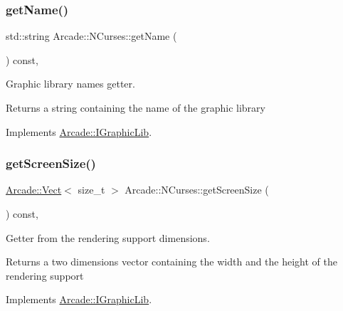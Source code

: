 \subsubsection{\texorpdfstring{get\+Name()}{getName()}}
{\footnotesize\ttfamily std\+::string Arcade\+::\+N\+Curses\+::get\+Name (\begin{DoxyParamCaption}{ }\end{DoxyParamCaption}) const\hspace{0.3cm}{\ttfamily [final]}, {\ttfamily [virtual]}}



Graphic library name\textquotesingle{}s getter. 

\begin{DoxyReturn}{Returns}
a string containing the name of the graphic library 
\end{DoxyReturn}


Implements \hyperlink{class_arcade_1_1_i_graphic_lib_aecc266c4ac10f07f4cdca023e74e843d}{Arcade\+::\+I\+Graphic\+Lib}.

\mbox{\label{class_arcade_1_1_n_curses_ae7a4eb70b4a07dc2d65f135c6f7ceb50}} 
\subsubsection{\texorpdfstring{get\+Screen\+Size()}{getScreenSize()}}
{\footnotesize\ttfamily \hyperlink{class_arcade_1_1_vect}{Arcade\+::\+Vect}$<$ size\+\_\+t $>$ Arcade\+::\+N\+Curses\+::get\+Screen\+Size (\begin{DoxyParamCaption}{ }\end{DoxyParamCaption}) const\hspace{0.3cm}{\ttfamily [final]}, {\ttfamily [virtual]}}



Getter from the rendering support dimensions. 

\begin{DoxyReturn}{Returns}
a two dimensions vector containing the width and the height of the rendering support 
\end{DoxyReturn}


Implements \hyperlink{class_arcade_1_1_i_graphic_lib_a0ce5eb4661d55b6e729fc1c16566dd9f}{Arcade\+::\+I\+Graphic\+Lib}.

\mbox{\label{class_arcade_1_1_n_curses_a04a81ada3532d84f6369479c0779dd1a}} 
